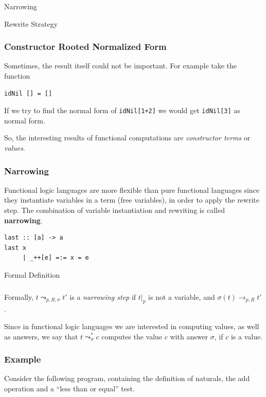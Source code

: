 \documentclass{beamer}
\begin{document}
\begin{section}{Narrowing}
\begin{subsection}{Rewrite Strategy}
\begin{frame}[fragile]

\frametitle{Constructor Rooted Normalized Form}
Sometimes, the result itself could not be important. For example take the function

\begin{example}
\begin{verbatim}
idNil [] = []
\end{verbatim}
\end{example}
If we try to find the normal form of \verb|idNil[1+2]| we would get \verb|idNil[3]| as normal form.

So, the interesting results of functional computations are \textit{constructor terms} or \textit{values}.
\end{frame}

\begin{frame}
[fragile]

\frametitle{Narrowing}

Functional logic languages are more flexible than pure functional languages since they instantiate variables in a term (free variables), in order to apply the rewrite step. The combination of variable instantiation and rewriting is called \textbf{narrowing}.
\begin{example}
\begin{verbatim}
last :: [a] -> a
last x
     | _++[e] =:= x = e
\end{verbatim}
\end{example}
\end{frame}

\end{subsection}

\begin{subsection}{Formal Definition}
\begin{frame}
\frametitle{\subsecname}
  Formally, $t \leadsto _{p,R,\sigma} t'$ is a \textit{narrowing step} if $t|_p$ is not a variable, and $\sigma(t) \rightarrow_{p,R} t'$.


\bigskip
 Since in functional logic languages we are interested in computing values, as well as answers, we say that $t \leadsto ^ * _ \sigma c$ computes the value $c$ with answer $\sigma$, if $c$ is a value.
  \end{frame}
\end{subsection}

  
\begin{frame}
[fragile]

\frametitle{Example}
  Consider the following program, containing the definition of naturals, the add operation and a ``less than or equal'' test.


\end{frame}
\end{section}
\end{document}
